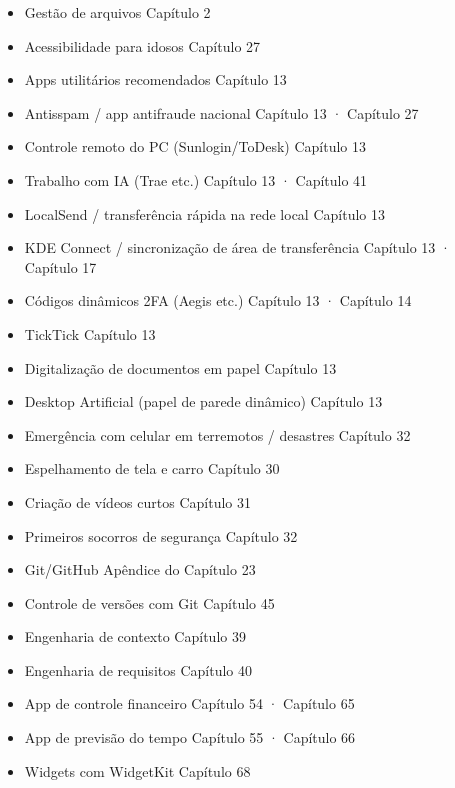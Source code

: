 \begin{itemize}
  \item Gestão de arquivos Capítulo 2
  \item Acessibilidade para idosos Capítulo 27
  \item Apps utilitários recomendados Capítulo 13
  \item Antisspam / app antifraude nacional Capítulo 13 · Capítulo 27
  \item Controle remoto do PC (Sunlogin/ToDesk) Capítulo 13
  \item Trabalho com IA (Trae etc.) Capítulo 13 · Capítulo 41
  \item LocalSend / transferência rápida na rede local Capítulo 13
  \item KDE Connect / sincronização de área de transferência Capítulo 13 · Capítulo 17
  \item Códigos dinâmicos 2FA (Aegis etc.) Capítulo 13 · Capítulo 14
  \item TickTick Capítulo 13
  \item Digitalização de documentos em papel Capítulo 13
  \item Desktop Artificial (papel de parede dinâmico) Capítulo 13
  \item Emergência com celular em terremotos / desastres Capítulo 32
  \item Espelhamento de tela e carro Capítulo 30
  \item Criação de vídeos curtos Capítulo 31
  \item Primeiros socorros de segurança Capítulo 32
  \item Git/GitHub Apêndice do Capítulo 23
  \item Controle de versões com Git Capítulo 45
  \item Engenharia de contexto Capítulo 39
  \item Engenharia de requisitos Capítulo 40
  \item App de controle financeiro Capítulo 54 · Capítulo 65
  \item App de previsão do tempo Capítulo 55 · Capítulo 66
  \item Widgets com WidgetKit Capítulo 68
\end{itemize}
